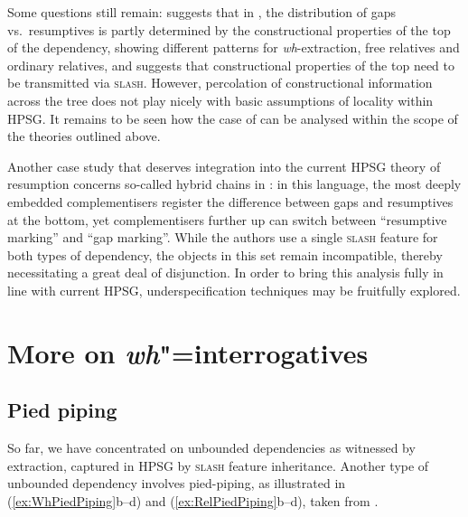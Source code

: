 \documentclass[output=paper
,notxmath 
	        ,collection
	        ,collectionchapter
 	        ,biblatex
                ,babelshorthands
                ,newtxmath
                ,draftmode
                ,colorlinks, citecolor=brown
]{langscibook}
\begin{document}
Some questions still remain: \citet[Section~6.5]{taghvaipour:phd:05}
suggests that in , the distribution of gaps vs.\ resumptives is
partly determined by the constructional properties of the top of the
dependency, showing different patterns for \emph{wh}-extraction, free
relatives and ordinary relatives, and suggests that constructional
properties of the top need to be transmitted via \textsc{slash}.
However, percolation of constructional information across the tree
does not play nicely with basic assumptions of locality within
HPSG. It remains to be seen how the case of  can be analysed
within the scope of the theories outlined above.

Another case study that deserves integration into the current HPSG
theory of resumption concerns so-called hybrid chains in 
\citep{assmann10:_does_chain_hybrid_irish_suppor}: in this language,
the most deeply embedded complementisers register the difference
between gaps and resumptives at the bottom, yet complementisers
further up can switch between ``resumptive marking'' and ``gap
marking''. While the authors use a single \textsc{slash} feature for
both types of dependency, the objects in this set remain incompatible,
thereby necessitating a great deal of disjunction. In order to bring
this analysis fully in line with current HPSG, underspecification
techniques may be fruitfully explored.



\section{More on \emph{wh}"=interrogatives}
\label{sec:UDC:MoreWh}

\subsection{Pied piping}

So far, we have concentrated on unbounded dependencies as witnessed by
extraction, captured in HPSG by \textsc{slash} feature
inheritance. Another type of unbounded dependency involves
pied-piping, as illustrated in (\ref{ex:WhPiedPiping}b--d) and
(\ref{ex:RelPiedPiping}b--d), taken from \citet[184]{Ginzburg:Sag:01}.
\end{document}
